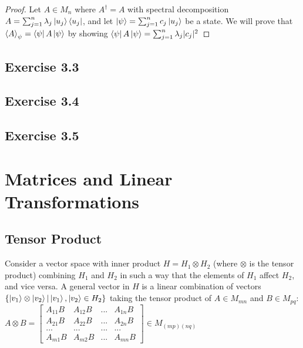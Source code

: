 \documentclass[12pt]{article}
\theoremstyle{plain}
\theoremstyle{nonumberplain}
\theoremstyle{plain}
\theoremstyle{nonumberplain}
\newtheorem{proof}{Proof.}
\newcommand\1{{\bf 1}}
\newcommand{\bmat}[1]{\begin{bmatrix*} #1 \end{bmatrix*}} %
\newcommand{\<}{\left\langle}
\renewcommand{\>}{\right\rangle}
\begin{document}
\begin{proof}
Let $A\in M_n$ where $A^\dagger=A$ with spectral decomposition $A=\sum^n_{j=1}\lambda_j\ket{u_j}\bra{u_j}$, and let $\ket{\psi}=\sum^n_{j=1}c_j\ket{u_j}$ be a state. We will prove that $\left\langle A \right\rangle_\psi=\bra{\psi}A\ket{\psi}$ by showing $\bra{\psi}A\ket{\psi}=\sum^n_{j=1}\lambda_j|c_j|^2$
\end{proof}


\subsection{Exercise 3.3}


\subsection{Exercise 3.4}


\subsection{Exercise 3.5}


\section{Matrices and Linear Transformations}


\subsection{Tensor Product}
Consider a vector space with inner product $H=H_1\otimes H_2$ (where $\otimes$ is the tensor product) combining $H_1$ and $H_2$ in such a way that the elements of $H_1$ affect $H_2$, and vice versa. A general vector in $H$ is a linear combination of vectors $\lbrace\ket{v_1}\otimes\ket{v_2}\vert\ket{v_1},\ket{v_2}\in H_2\rbrace$ taking the tensor product of $A\in M_{mn}$ and $B\in M_{pq}$: \\
$A\otimes B=\bmat{
A_{11}B & A_{12}B & ... & A_{1n}B \\
A_{21}B & A_{22}B & ... & A_{2n}B \\
... & ... & ... & ... \\
A_{m1}B & A_{m2}B & ... & A_{mn}B
}\in M_{(mp)(nq)}$
\end{document}
